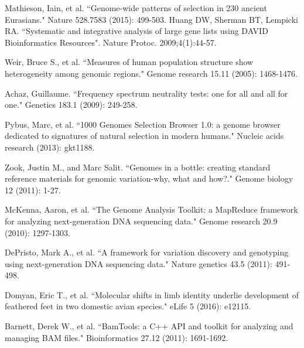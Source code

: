 \documentclass[10pt,letterpaper]{article}
\begin{document}
\begin{thebibliography}{10}
Mathieson, Iain, et al. ``Genome-wide patterns of selection in 230 ancient Eurasians." Nature 528.7583 (2015): 499-503.
\bibitem
Huang DW, Sherman BT, Lempicki RA. ``Systematic and integrative analysis of large gene lists using DAVID Bioinformatics Resources". Nature Protoc. 2009;4(1):44-57.

Weir, Bruce S., et al. ``Measures of human population structure show heterogeneity among genomic regions." Genome research 15.11 (2005): 1468-1476.

Achaz, Guillaume. ``Frequency spectrum neutrality tests: one for all and all for one." Genetics 183.1 (2009): 249-258.

Pybus, Marc, et al. ``1000 Genomes Selection Browser 1.0: a genome browser dedicated to signatures of natural selection in modern humans." Nucleic acids research (2013): gkt1188.

Zook, Justin M., and Marc Salit. ``Genomes in a bottle: creating standard reference materials for genomic variation-why, what and how?." Genome biology 12 (2011): 1-27.

McKenna, Aaron, et al. ``The Genome Analysis Toolkit: a MapReduce framework for analyzing next-generation DNA sequencing data." Genome research 20.9 (2010): 1297-1303.

DePristo, Mark A., et al. ``A framework for variation discovery and genotyping using next-generation DNA sequencing data." Nature genetics 43.5 (2011): 491-498.

Domyan, Eric T., et al. ``Molecular shifts in limb identity underlie development of feathered feet in two domestic avian species." eLife 5 (2016): e12115.

Barnett, Derek W., et al. ``BamTools: a C++ API and toolkit for analyzing and managing BAM files." Bioinformatics 27.12 (2011): 1691-1692.

\end{thebibliography}
\end{document}
